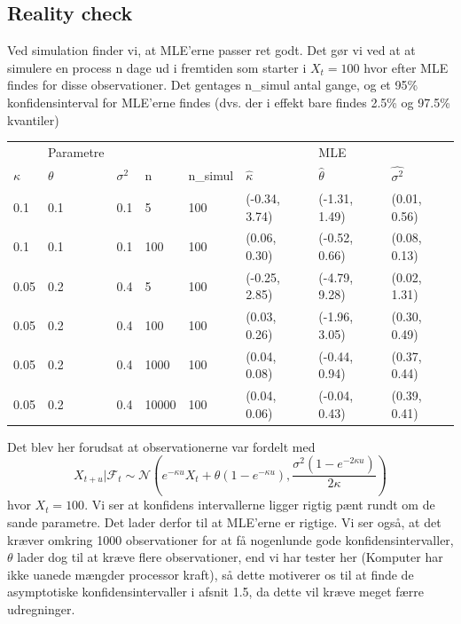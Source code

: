\documentclass{article}
\theoremstyle{definition}
\theoremstyle{remark}
\begin{document}
\subsection{Reality check}
Ved simulation finder vi, at MLE'erne passer ret godt. Det gør vi ved at at simulere en process n dage ud i fremtiden som starter i $X_t=100$  hvor efter MLE findes for disse observationer. Det gentages n\_simul antal gange, og et 95\% konfidensinterval for MLE'erne findes (dvs. der i effekt bare findes 2.5\% og 97.5\% kvantiler) 
\begin{center}
\begin{tabular}{llllllll}
 &Parametre&& &&& MLE  \\
 $\kappa$&$\theta$&$\sigma^2$&n&n\_simul&$\hat \kappa$&$\hat\theta$&$\hat{\sigma^2}$ \\
 0.1 & 0.1 & 0.1 & 5& 100 & (-0.34, 3.74)&(-1.31, 1.49)&(0.01, 0.56)\\
 0.1 & 0.1 & 0.1 & 100& 100 & (0.06, 0.30)&(-0.52, 0.66)&(0.08, 0.13)\\
 0.05&0.2&0.4&5&100&(-0.25, 2.85)&(-4.79, 9.28)&(0.02, 1.31)\\
 0.05&0.2&0.4&100&100&(0.03, 0.26)&(-1.96, 3.05)&(0.30, 0.49)\\
 0.05&0.2&0.4&1000&100&(0.04, 0.08)&(-0.44, 0.94)&(0.37, 0.44)\\
 0.05&0.2&0.4&10000&100&(0.04, 0.06)&(-0.04, 0.43)&(0.39, 0.41)
\end{tabular}
\end{center}
Det blev her forudsat at observationerne var fordelt med 
$$X_{t+u}|\mathcal F_t\sim\mathcal N\left(e^{-\kappa u}X_t + \theta(1-e^{-\kappa u}),\frac{\sigma^2 (1-e^{-2\kappa u})}{2\kappa}\right)$$
hvor $X_t=100$. Vi ser at konfidens intervallerne ligger rigtig pænt rundt om de sande parametre. Det lader derfor til at MLE'erne er rigtige. Vi ser også, at det kræver omkring 1000 observationer for at få nogenlunde gode konfidensintervaller, $\theta$ lader dog til at kræve flere observationer, end vi har tester her (Komputer har ikke uanede mængder processor kraft), så dette motiverer os til at finde de asymptotiske konfidensintervaller i afsnit 1.5, da dette vil kræve meget færre udregninger.  
\end{document}
